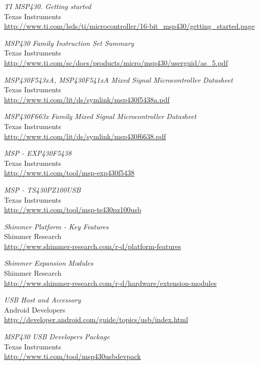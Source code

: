 \begin{thebibliography}{widest-label}
	\emph{TI MSP430. Getting started}\\
	Texas Instruments\\
	\url{http://www.ti.com/lsds/ti/microcontroller/16-bit_msp430/getting_started.page}
	
	\emph{MSP430 Family Instruction Set Summary}\\
	Texas Instruments\\
	\url{http://www.ti.com/sc/docs/products/micro/msp430/userguid/as_5.pdf}
	
	\emph{MSP430F543xA, MSP430F541xA Mixed Signal Microcontroller Datasheet}\\
	Texas Instruments\\
	\url{http://www.ti.com/lit/ds/symlink/msp430f5438a.pdf}
	
	\emph{MSP430F663x Family Mixed Signal Microcontroller Datasheet}\\
	Texas Instruments\\
	\url{http://www.ti.com/lit/ds/symlink/msp430f6638.pdf}

	\emph{MSP - EXP430F5438}\\
	Texas Instruments\\
	\url{http://www.ti.com/tool/msp-exp430f5438}

	\emph{MSP - TS430PZ100USB}\\
	Texas Instruments\\
	\url{http://www.ti.com/tool/msp-ts430pz100usb}

	\emph{Shimmer Platform - Key Features}\\
	Shimmer Research\\
	\url{http://www.shimmer-research.com/r-d/platform-features}

	\emph{Shimmer Expansion Modules}\\
	Shimmer Research\\
	\url{http://www.shimmer-research.com/r-d/hardware/extension-modules}

	\emph{USB Host and Accessory}\\
	Android Developers\\
	\url{http://developer.android.com/guide/topics/usb/index.html}
	
	\emph{MSP430 USB Developers Package}\\
	Texas Instruments\\
	\url{http://www.ti.com/tool/msp430usbdevpack}
	

\end{thebibliography}
